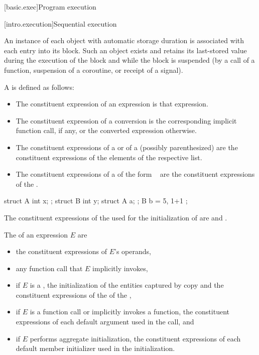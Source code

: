 [basic.exec]{Program execution}

[intro.execution]{Sequential execution}

\pnum
An instance of each object with automatic storage
duration is associated with each entry into its
block. Such an object exists and retains its last-stored value during
the execution of the block and while the block is suspended (by a call
of a function, suspension of a coroutine, or receipt of a signal).

\pnum
A  is defined as follows:
\begin{itemize}
\item
The constituent expression of an expression is that expression.
\item
The constituent expression of a conversion is
the corresponding implicit function call, if any, or
the converted expression otherwise.
\item
The constituent expressions of a  or
of a (possibly parenthesized) 
are the constituent expressions of the elements of the respective list.
\item
The constituent expressions of a 
of the form \tcode{=}~
are the constituent expressions of the .
\end{itemize}
\begin{example}
\begin{codeblock}
struct A { int x; };
struct B { int y; struct A a; };
B b = { 5, { 1+1 } };
\end{codeblock}
The constituent expressions of the 
used for the initialization of  are  and .
\end{example}

\pnum
The  of an expression $E$ are
\begin{itemize}
\item
the constituent expressions of $E$'s operands,
\item
any function call that $E$ implicitly invokes,
\item
if $E$ is a ,
the initialization of the entities captured by copy and
the constituent expressions of the  of the ,
\item
if $E$ is a function call or implicitly invokes a function,
the constituent expressions of each default argument
used in the call, and
\item
if $E$ performs aggregate initialization,
the constituent expressions of each default member initializer
used in the initialization.
\end{itemize}

